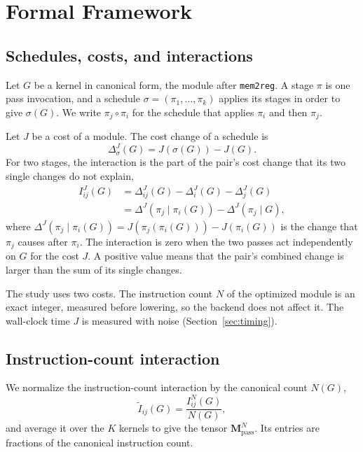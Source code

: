 \section{Formal Framework}
\label{sec:framework}

\subsection{Schedules, costs, and interactions}

Let $G$ be a kernel in canonical form, the module after \texttt{mem2reg}. A stage $\pi$ is one pass invocation, and a
schedule $\sigma=(\pi_1,\dots,\pi_k)$ applies its stages in order to give $\sigma(G)$. We write $\pi_j\circ\pi_i$ for the
schedule that applies $\pi_i$ and then $\pi_j$.

Let $J$ be a cost of a module. The cost change of a schedule is
\begin{equation}\label{eq:delta}
  \Delta^J_\sigma(G)=J(\sigma(G))-J(G).
\end{equation}
For two stages, the interaction is the part of the pair's cost change that its two single changes do not explain,
\begin{equation}\label{eq:interaction}
\begin{split}
  I^J_{ij}(G)&=\Delta^J_{ij}(G)-\Delta^J_i(G)-\Delta^J_j(G)\\
  &=\Delta^J(\pi_j\mid\pi_i(G))-\Delta^J(\pi_j\mid G),
\end{split}
\end{equation}
where $\Delta^J(\pi_j\mid\pi_i(G))=J(\pi_j(\pi_i(G)))-J(\pi_i(G))$ is the change that $\pi_j$ causes after $\pi_i$. The
interaction is zero when the two passes act independently on $G$ for the cost $J$. A positive value means that the pair's
combined change is larger than the sum of its single changes.

The study uses two costs. The instruction count $N$ of the optimized module is an exact integer, measured before lowering, so
the backend does not affect it. The wall-clock time $J$ is measured with noise (Section~\ref{sec:timing}).

\subsection{Instruction-count interaction}

We normalize the instruction-count interaction by the canonical count $N(G)$,
\begin{equation}\label{eq:instcount}
  \tilde I_{ij}(G)=\frac{I^N_{ij}(G)}{N(G)},
\end{equation}
and average it over the $K$ kernels to give the tensor $\mathbf{M}^N_{\mathrm{pass}}$. Its entries are fractions of the
canonical instruction count.

